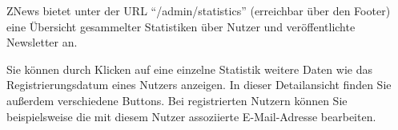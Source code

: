 ZNews bietet unter der URL ``/admin/statistics'' (erreichbar über den Footer)
eine Übersicht gesammelter Statistiken über Nutzer und veröffentlichte Newsletter an.


Sie können durch Klicken auf eine einzelne Statistik
weitere Daten wie das Registrierungsdatum eines Nutzers
anzeigen.
In dieser Detailansicht finden Sie außerdem verschiedene Buttons.
Bei registrierten Nutzern können Sie beispielsweise
die mit diesem Nutzer assoziierte E-Mail-Adresse bearbeiten.


